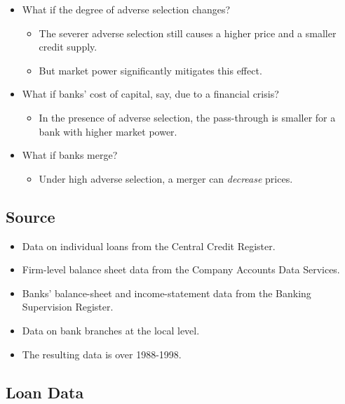 \documentclass[
]{book}
\providecommand{\tightlist}{%
  \setlength{\itemsep}{0pt}\setlength{\parskip}{0pt}}
\begin{document}
\begin{itemize}
\tightlist
\item
  What if the degree of adverse selection changes?

  \begin{itemize}
  \tightlist
  \item
    The severer adverse selection still causes a higher price and a smaller credit supply.
  \item
    But market power significantly mitigates this effect.
  \end{itemize}
\item
  What if banks' cost of capital, say, due to a financial crisis?

  \begin{itemize}
  \tightlist
  \item
    In the presence of adverse selection, the pass-through is smaller for a bank with higher market power.
  \end{itemize}
\item
  What if banks merge?

  \begin{itemize}
  \tightlist
  \item
    Under high adverse selection, a merger can \emph{decrease} prices.
  \end{itemize}
\end{itemize}

\hypertarget{source}{%
\subsection{Source}\label{source}}

\begin{itemize}
\tightlist
\item
  Data on individual loans from the Central Credit Register.
\item
  Firm-level balance sheet data from the Company Accounts Data Services.
\item
  Banks' balance-sheet and income-statement data from the Banking Supervision Register.
\item
  Data on bank branches at the local level.
\item
  The resulting data is over 1988-1998.
\end{itemize}

\hypertarget{loan-data}{%
\subsection{Loan Data}\label{loan-data}}
\end{document}
